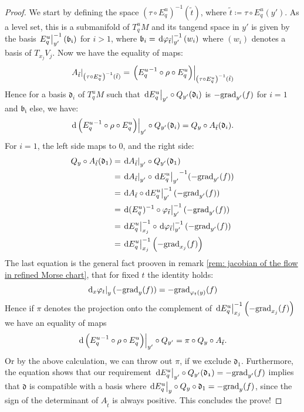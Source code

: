 \begin{proof}
	
	We start by defining the space $\left(\tau\circ E^u_q\right)^{-1}(\tilde t)$, where $\tilde{t}\coloneq \tau\circ E^u_q(y')$. As a level set, this is a submanifold of $T^u_qM$ and its tangend space in $y'$ is given by the basis $\left.E^u_q\right|_{y'}^{-1}(\mathfrak{b_i})$ for $i>1$, where $\mathfrak{b}_i=\left.\mathop{}\!\mathrm{d} \varphi_{\tilde{t}}\right|_{y'}^{-1}({w_i})$ where $(w_i)$ denotes a basis of $T_{x_j}V_j$. Now we have the equality of maps:
	\begin{align*}
		\left.A_{\tilde{t}}\right|_{\left(\tau\circ E^u_q\right)^{-1}(\tilde t)}=\left.\left({E^u_q}^{-1}\circ \rho \circ E^u_q\right)\right|_{\left(\tau\circ E^u_q\right)^{-1}(\tilde t)}
	\end{align*} Hence for a basis $\mathfrak{d}_i$ of $T^u_qM$ such that $\left.\mathop{}\!\mathrm{d} E^u_q\right|_{y'}\circ Q_{y'}(\mathfrak{d_i})$ is $-\mathrm{grad}_{y'}(f)$ for $i=1$ and $\mathfrak{b_i}$ else, we have:
	\begin{equation*}
		\left.\mathop{}\!\mathrm{d} \left({E^u_q}^{-1}\circ \rho \circ E^u_q\right)\right|_{y'}\circ Q_{y'}(\mathfrak{d}_i)=Q_y\circ A_{\tilde{t}}(\mathfrak{d}_i).
	\end{equation*} For $i=1$, the left side maps to $0$, and the right side:
	\begin{align*}
		Q_y\circ A_{\tilde{t}}(\mathfrak{d}_1)
		&=\restr{\diff A_{\tilde{t}}}{y'}\circ Q_{y'}(\mathfrak{d}_1)\\
		&=\restr{\diff A_{\tilde{t}}}{y'} \circ {\restr{\diff E^u_q}{y'}}^{-1}(-\grad_{y'}(f))\\
		&=\restr{\diff A_{\tilde{t}} \circ \diff E^u_q}{y'}^{-1}(-\grad_{y'}(f))\\
		&=\restr{ \diff (E^u_q)^{-1} \circ \phi_{\tilde{t}}}{y'}^{-1}(-\grad_{y'}(f))\\
		&=\restr{ \diff E^u_q}{x_j}^{-1} \circ \restr{\diff \phi_{\tilde{t}}}{y'}^{-1}(-\grad_{y'}(f))\\
		&=\restr{ \diff E^u_q}{x_j}^{-1} \left(-\grad_{x_j}(f)\right)
	\end{align*} The last equation is the general fact prooven in remark \ref{rem: jacobian of the flow in refined Morse chart}, that for fixed $t$ the identity holds:
	\begin{equation*}
		\left.\mathop{}\!\mathrm{d}_x \varphi_t\right|_{y} (-\mathrm{grad}_y(f))=-\mathrm{grad}_{\varphi_t(y)}(f)
	\end{equation*} Hence if $\pi$ denotes the projection onto the complement of $ \left. \mathop{}\!\mathrm{d} E^u_q\right|_{x_j}^{-1} \left(-\mathrm{grad}_{x_j}(f)\right)$ we have an equality of maps
	\begin{equation*}
		\left.\mathop{}\!\mathrm{d} \left({E^u_q}^{-1}\circ \rho \circ E^u_q\right)\right|_{y'}\circ Q_{y'}=\pi \circ Q_y\circ A_{\tilde{t}}.
	\end{equation*} Or by the above calculation, we can throw out $\pi$, if we exclude $\mathfrak{d}_1$. Furthermore, the equation shows that our requirement $\left.\mathop{}\!\mathrm{d} E^u_q\right|_{y'}\circ Q_{y'}(\mathfrak{d_1})=-\mathrm{grad}_{y'}(f)$ implies that $\mathfrak{d}$ is compatible with a basis where $\left.\mathop{}\!\mathrm{d} E^u_q\right|_{y}\circ Q_y\circ \mathfrak{d}_1=-\mathrm{grad}_y(f)$, since the sign of the determinant of $A_{\tilde{t}}$ is always positive.
	This concludes the prove!
\end{proof}
